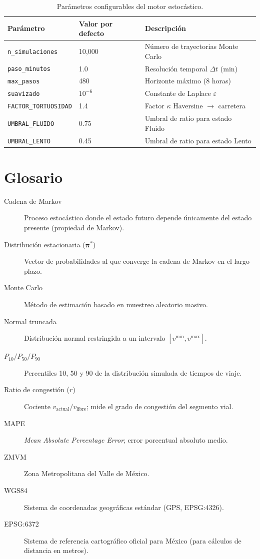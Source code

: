 \documentclass[12pt, a4paper]{article}
\theoremstyle{definition}
\begin{document}
\begin{table}[h!]
\centering
\renewcommand{\arraystretch}{1.3}
\begin{tabular}{lll}
\toprule
\textbf{Parámetro} & \textbf{Valor por defecto} & \textbf{Descripción} \\
\midrule
\texttt{n\_simulaciones}    & 10{,}000       & Número de trayectorias Monte Carlo \\
\texttt{paso\_minutos}      & 1.0            & Resolución temporal $\Delta t$ (min) \\
\texttt{max\_pasos}         & 480            & Horizonte máximo (8 horas) \\
\texttt{suavizado}          & $10^{-6}$      & Constante de Laplace $\varepsilon$ \\
\texttt{FACTOR\_TORTUOSIDAD} & 1.4           & Factor $\kappa$ Haversine $\to$ carretera \\
\texttt{UMBRAL\_FLUIDO}     & 0.75           & Umbral de ratio para estado Fluido \\
\texttt{UMBRAL\_LENTO}      & 0.45           & Umbral de ratio para estado Lento \\
\bottomrule
\end{tabular}
\caption{Parámetros configurables del motor estocástico.}
\end{table}

\section{Glosario}

\begin{description}
    \item[Cadena de Markov] Proceso estocástico donde el estado futuro depende
        únicamente del estado presente (propiedad de Markov).
    \item[Distribución estacionaria ($\bm{\pi}^*$)] Vector de probabilidades
        al que converge la cadena de Markov en el largo plazo.
    \item[Monte Carlo] Método de estimación basado en muestreo aleatorio masivo.
    \item[Normal truncada] Distribución normal restringida a un intervalo
        $[v^\text{min}, v^\text{max}]$.
    \item[$P_{10} / P_{50} / P_{90}$] Percentiles 10, 50 y 90 de la distribución
        simulada de tiempos de viaje.
    \item[Ratio de congestión ($r$)] Cociente $v_\text{actual} / v_\text{libre}$;
        mide el grado de congestión del segmento vial.
    \item[MAPE] \textit{Mean Absolute Percentage Error}; error porcentual
        absoluto medio.
    \item[ZMVM] Zona Metropolitana del Valle de México.
    \item[WGS84] Sistema de coordenadas geográficas estándar (GPS, EPSG:4326).
    \item[EPSG:6372] Sistema de referencia cartográfico oficial para México
        (para cálculos de distancia en metros).
\end{description}
\end{document}
